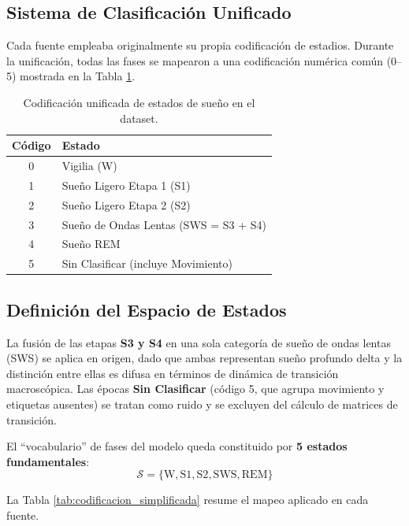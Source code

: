 \subsection{Sistema de Clasificación Unificado}

Cada fuente empleaba originalmente su propia codificación de estadios. Durante la unificación, todas las fases se mapearon a una codificación numérica común (0--5) mostrada en la Tabla \ref{tab:codificacion_original}.

\begin{table}[htbp]
\centering
\caption{Codificación unificada de estados de sueño en el dataset.}
\label{tab:codificacion_original}
\begin{tabular}{cl}
\hline
\textbf{Código} & \textbf{Estado} \\
\hline
0 & Vigilia (W) \\
1 & Sueño Ligero Etapa 1 (S1) \\
2 & Sueño Ligero Etapa 2 (S2) \\
3 & Sueño de Ondas Lentas (SWS = S3 + S4) \\
4 & Sueño REM \\
5 & Sin Clasificar (incluye Movimiento) \\
\hline
\end{tabular}
\end{table}

\subsection{Definición del Espacio de Estados}

La fusión de las etapas \textbf{S3 y S4} en una sola categoría de sueño de ondas lentas (SWS) se aplica en origen, dado que ambas representan sueño profundo delta y la distinción entre ellas es difusa en términos de dinámica de transición macroscópica. Las épocas \textbf{Sin Clasificar} (código 5, que agrupa movimiento y etiquetas ausentes) se tratan como ruido y se excluyen del cálculo de matrices de transición.

El ``vocabulario'' de fases del modelo queda constituido por \textbf{5 estados fundamentales}:
\begin{equation}
    \mathcal{S} = \{ \text{W}, \text{S1}, \text{S2}, \text{SWS}, \text{REM} \}
    \label{eq:vocabulario}
\end{equation}

La Tabla \ref{tab:codificacion_simplificada} resume el mapeo aplicado en cada fuente.


